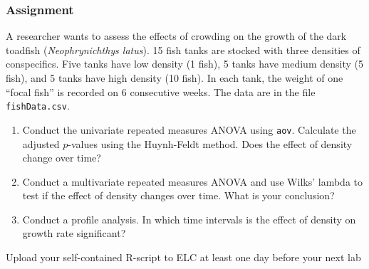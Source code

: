 \documentclass[color=usenames,dvipsnames]{beamer}\usepackage[]{graphicx}\usepackage[]{color}
\newcommand{\inr}[1]{\colorbox{inlinecolor}{\texttt{#1}}}
\begin{document}
\begin{frame}
  \frametitle{Assignment}
  \footnotesize
  A researcher wants to assess the effects of crowding on the growth
  of the dark toadfish ({\it Neophrynichthys latus}). 15 fish tanks
  are stocked with three densities of conspecifics. Five tanks have
  low density (1 fish), 5 tanks have medium density (5
  fish), and 5 tanks have high density (10 fish).
  In each tank, the weight of one ``focal fish'' is recorded on 6
  consecutive weeks. The data are in the file {\tt fishData.csv}.
  \pause
  \vfill
  \begin{enumerate}[\bf (1)]
    \item Conduct the univariate repeated measures ANOVA using
      \inr{aov}. Calculate  the adjusted $p$-values using the Huynh-Feldt
      method. Does the effect of density change over time?
    \item Conduct a multivariate repeated measures ANOVA and use
      Wilks' lambda to test if the effect of density changes over
      time. What is your conclusion?
    \item Conduct a profile analysis. In which time intervals is the
      effect of density on growth rate significant?
  \end{enumerate}
  \pause
  \vfill
  \centering
  Upload your self-contained R-script to ELC at least one day before
  your next lab \\
\end{frame}
\end{document}
